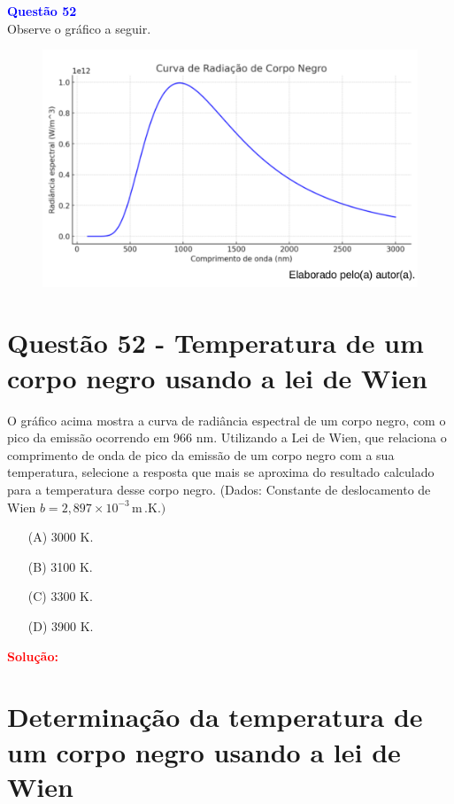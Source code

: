 \documentclass[a4paper,12pt]{article}
\begin{document}
\begin{flushleft}
\textbf{\textcolor{blue}{\Large Quest\~ao 52}}\\
\noindent
Observe o gráfico a seguir.

\begin{figure}[h]
\centering
\includegraphics[scale=0.5]{figures/radiacaocorponegro.png}
\end{figure}
\section{Quest\~ao 52 - Temperatura de um corpo negro usando a lei de Wien}
O gráfico acima mostra a curva de radiância espectral de um
corpo negro, com o pico da emissão ocorrendo em 966 nm.
Utilizando a Lei de Wien, que relaciona o comprimento de
onda de pico da emissão de um corpo negro com a sua
temperatura, selecione a resposta que mais se aproxima do
resultado calculado para a temperatura desse corpo negro.
(Dados: Constante de deslocamento de Wien $b = 2{,}897 \times 10^{-3}\,\mathrm{m}\,.\mathrm{K}.)$

\begin{itemize}
\item[(A)] 3000 K.
\item[(B)] 3100 K.
\item[(C)] 3300 K.
\item[(D)] 3900 K.
\end{itemize}

\vspace{0.5cm}

\textcolor{red}{\textbf{Solução:}}\\

\section*{Determinação da temperatura de um corpo negro usando a lei de Wien}


\end{flushleft}
\end{document}
